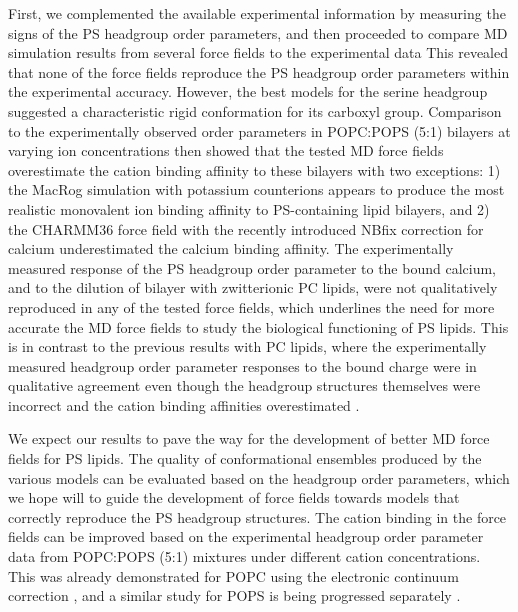 \documentclass[aps,prl,superscriptaddress,twocolumn]{revtex4}
\begin{document}
First, we complemented the available experimental information \cite{browning80,roux90} by measuring the signs of the PS headgroup order parameters,
and then proceeded to compare MD simulation results from several force fields to the experimental data
This revealed that none of the force fields
reproduce the PS headgroup order parameters within the experimental accuracy. However,
the best models for the serine headgroup suggested a characteristic rigid conformation for its
carboxyl group. Comparison to the experimentally observed order parameters in POPC:POPS (5:1) bilayers  at varying ion
concentrations \cite{roux90} then showed that the tested MD force fields
overestimate the cation binding affinity to these bilayers with two exceptions: 1) the MacRog simulation with potassium counterions appears to produce the most realistic monovalent ion binding
affinity to PS-containing lipid bilayers, and 2) the CHARMM36 force field with the recently introduced
NBfix correction for calcium \cite{kim16} underestimated the calcium binding affinity.
The experimentally measured response of the PS headgroup order parameter to the bound calcium, and to the dilution of bilayer with zwitterionic PC lipids, were not
qualitatively reproduced in any of the tested force fields, which underlines the need for more accurate
the MD force fields to study the biological functioning of PS lipids.
This is in contrast to the previous results with PC lipids,
where the experimentally measured headgroup order parameter responses to the bound charge
were in qualitative agreement even though the headgroup structures themselves were
incorrect and the cation binding affinities overestimated \cite{catte16}.

We expect our results to pave the way for the development of better MD force fields
for PS lipids. The quality of conformational ensembles produced by the various models can be evaluated based on the headgroup order parameters, which we hope will to guide the development of force fields towards models that correctly reproduce the PS headgroup structures. The cation binding in the force fields can be improved based on the experimental headgroup order parameter data from POPC:POPS (5:1) mixtures under different cation concentrations. This was already demonstrated for POPC using the electronic continuum correction \cite{melcr18}, and a
similar study for POPS is being progressed separately \cite{ECCpops}.


%
\end{document}
